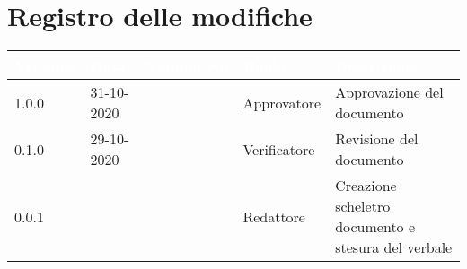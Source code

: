 \section*{Registro delle modifiche}
{
\setcounter{table}{-1}
{
\renewcommand{\arraystretch}{1.5}
\centering
\begin{longtable}{C{1.7cm} C{2.5cm} C{3.2cm} C{2.7cm} C{4.8cm}}
\textcolor{white}{\textbf{Versione}}&
\textcolor{white}{\textbf{Data}}&
\textcolor{white}{\textbf{Nominativo}}&
\textcolor{white}{\textbf{Ruolo}}&
\textcolor{white}{\textbf{Descrizione}}\\	
\endhead
		
1.0.0 & 31-10-2020 & \Approvatore{} & Approvatore & Approvazione del documento\\

0.1.0 & 29-10-2020 & \Verificatori{} & Verificatore & Revisione del documento\\

0.0.1 & \Data{} & \Redattori{} & Redattore & Creazione scheletro documento e stesura del verbale\\
		
\end{longtable}
}
}
